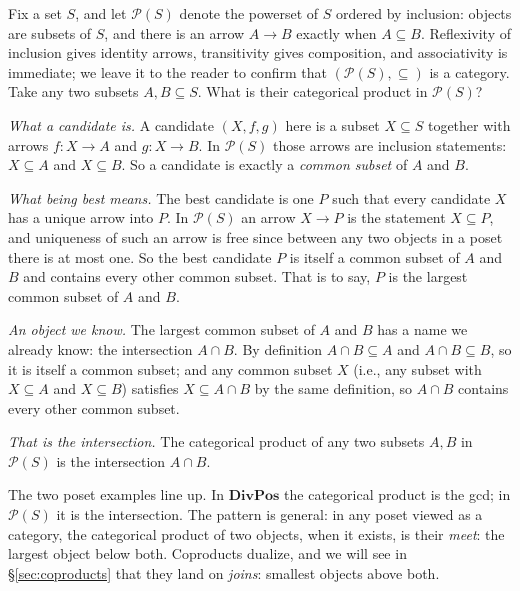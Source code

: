 \begin{example}\label{ex:powset-product}
Fix a set $S$, and let $\mathcal{P}(S)$ denote the powerset of $S$
ordered by inclusion: objects are subsets of $S$, and there is an
arrow $A \to B$ exactly when $A \subseteq B$. Reflexivity of
inclusion gives identity arrows, transitivity gives composition,
and associativity is immediate; we leave it to the reader to
confirm that $(\mathcal{P}(S), \subseteq)$ is a category. Take any
two subsets $A, B \subseteq S$. What is their categorical product
in $\mathcal{P}(S)$?

\textit{What a candidate is.} A candidate $(X, f, g)$ here is a
subset $X \subseteq S$ together with arrows $f : X \to A$ and
$g : X \to B$. In $\mathcal{P}(S)$ those arrows are inclusion
statements: $X \subseteq A$ and $X \subseteq B$. So a candidate
is exactly a \textit{common subset} of $A$ and $B$.

\textit{What being best means.} The best candidate is one $P$
such that every candidate $X$ has a unique arrow into $P$. In
$\mathcal{P}(S)$ an arrow $X \to P$ is the statement
$X \subseteq P$, and uniqueness of such an arrow is free since
between any two objects in a poset there is at most one. So the
best candidate $P$ is itself a common subset of $A$ and $B$ and
contains every other common subset. That is to say, $P$ is the
largest common subset of $A$ and $B$.

\textit{An object we know.} The largest common subset of $A$ and
$B$ has a name we already know: the intersection $A \cap B$. By
definition $A \cap B \subseteq A$ and $A \cap B \subseteq B$, so
it is itself a common subset; and any common subset $X$ (i.e.,
any subset with $X \subseteq A$ and $X \subseteq B$) satisfies
$X \subseteq A \cap B$ by the same definition, so $A \cap B$
contains every other common subset.

\textit{That is the intersection.} The categorical product of any
two subsets $A, B$ in $\mathcal{P}(S)$ is the intersection
$A \cap B$.
\end{example}

\noindent The two poset examples line up. In $\mathbf{DivPos}$ the
categorical product is the gcd; in $\mathcal{P}(S)$ it is the
intersection. The pattern is general: in any poset viewed as a
category, the categorical product of two objects, when it exists,
is their \textit{meet}: the largest object
below both. Coproducts dualize, and we will see in
\S\ref{sec:coproducts} that they land on
\textit{joins}: smallest objects above both.

